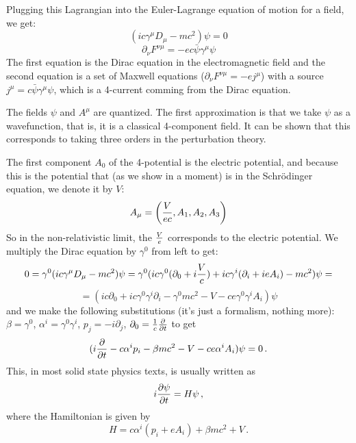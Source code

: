 Plugging this Lagrangian into the Euler-Lagrange equation of motion for a field, we get: 
\begin{equation*}
  (ic\gamma^\mu D_\mu-mc^2)\psi=0
\end{equation*}
\begin{equation*}
  \partial_\nu F^{\nu\mu}=-ec\bar\psi\gamma^\mu\psi
\end{equation*}
The first equation is the Dirac equation in the electromagnetic field and the second equation is a set of Maxwell equations ($\partial_\nu F^{\nu\mu}=-ej^\mu$) with a source $j^\mu=c\bar\psi\gamma^\mu\psi$, which is a 4-current comming from the Dirac equation.

The fields $\psi$ and $A^\mu$ are quantized. The first approximation is that we take $\psi$ as a wavefunction, that is, it is a classical 4-component field. It can be shown that this corresponds to taking three orders in the perturbation theory.

The first component $A_0$ of the 4-potential is the electric potential, and because this is the potential that (as we show in a moment) is in the Schrödinger equation, we denote it by $V$: 
\begin{equation*}
  A_\mu=\left({V\over ec},A_1,A_2,A_3\right)
\end{equation*}
So in the non-relativistic limit, the $V\over e$ corresponds to the electric potential. We multiply the Dirac equation by $\gamma^0$ from left to get: 
\begin{equation*}
  0=\gamma^0(ic\gamma^\mu D_\mu-mc^2)\psi= \gamma^0(ic\gamma^0(\partial_0+i{V\over c})+ic\gamma^i (\partial_i+ieA_i)-mc^2)\psi=
\end{equation*}
\begin{equation*}
  = (ic\partial_0+ic\gamma^0\gamma^i\partial_i-\gamma^0mc^2-V -ce\gamma^0\gamma^iA_i)\psi
\end{equation*}
and we make the following substitutions (it's just a formalism, nothing more): $\beta=\gamma^0$, $\alpha^i=\gamma^0\gamma^i$, $p_j=-i\partial_j$, $\partial_0={1\over c}{\partial\over\partial t}$ to get 
\begin{equation*}
  (i{\partial\over\partial t}-c\alpha^i p_i-\beta mc^2-V-ce\alpha^iA_i)\psi=0\,.
\end{equation*}
This, in most solid state physics texts, is usually written as 
\begin{equation*}
  i{\partial\psi\over\partial t}=H\psi\,,
\end{equation*}
where the Hamiltonian is given by 
\begin{equation*}
  H=c\alpha^i(p_i+eA_i)+\beta mc^2+V\,.
\end{equation*}

